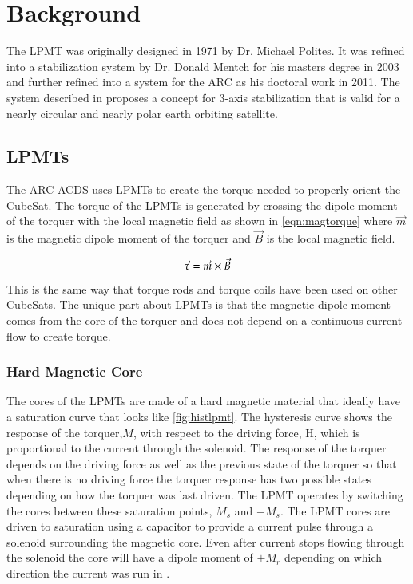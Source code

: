 

\chapter{Background}

\label{ch:BG}


The \ac{LPMT} was originally designed in 1971 by Dr. Michael Polites\cite{Polites71}. It was refined into a stabilization system by Dr. Donald Mentch for his masters degree in 2003 and further refined into a system for the \ac{ARC} as his doctoral work in 2011\cite{Mentch11}. The system described in \cite{Mentch11} proposes a concept for 3-axis stabilization that is valid for a nearly circular and nearly polar earth orbiting satellite.

\section{\aclp{LPMT}}

The \ac{ARC} \ac{ACDS} uses \acfp{LPMT} to create the torque needed to properly orient the CubeSat. The torque of the \acp{LPMT} is generated by crossing the dipole moment of the torquer with the local magnetic field as shown in \cref{eqn:magtorque} where $\vec{m}$ is the magnetic dipole moment of the torquer and $\vec{B}$ is the local magnetic field.

\begin{equation}
    \vec{\tau} = \vec{m} \times \vec{B}
    \label{eqn:magtorque}
\end{equation}

This is the same way that torque rods and torque coils have been used on other CubeSats. The unique part about \acp{LPMT} is that the magnetic dipole moment comes from the core of the torquer and does not depend on a continuous current flow to create torque.


\subsection{Hard Magnetic Core}

The cores of the \acp{LPMT} are made of a hard magnetic material that ideally have a saturation curve that looks like \cref{fig:histlpmt}. The hysteresis curve shows the response of the torquer,$M$, with respect to the driving force, H, which is proportional to the current through the solenoid. The response of the torquer depends on the driving force as well as the previous state of the torquer so that when there is no driving force the torquer response has two possible states depending on how the torquer was last driven. The \ac{LPMT} operates by switching the cores between these saturation points, $M_s$ and $-M_s$. The \ac{LPMT} cores are driven to saturation using a capacitor to provide a current pulse through a solenoid surrounding the magnetic core. Even after current stops flowing through the solenoid the core will have a dipole moment of $\pm M_r$ depending on which direction the current was run in \cite{Mentch11}.

